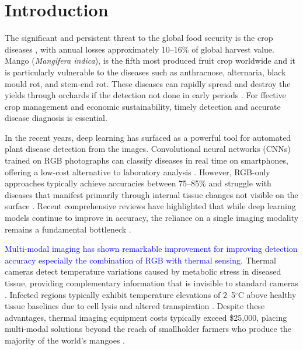 \documentclass[utf8]{FrontiersinHarvard} %
\begin{document}
\section{Introduction}

The significant and persistent threat to the global food security is the crop diseases \cite{fao2021,fao2023,savary2019}, with annual losses approximately 10--16\% of global harvest value. Mango (\textit{Mangifera indica}), is the fifth most produced fruit crop worldwide and it is particularly vulnerable to the diseases such as anthracnose, alternaria, black mould rot, and stem-end rot. These diseases can rapidly spread and destroy the yields  through orchards if the detection not done in early periods \cite{singh2019}. For ffective crop management and economic sustainability, timely detection and accurate disease diagnosis is essential.

In the recent years, deep learning has surfaced as a powerful tool for automated plant disease detection \cite{mohanty2016,ferentinos2018,thakur2022} from the images. Convolutional neural networks (CNNs) trained on RGB photographs can classify diseases in real time on smartphones, offering a low-cost alternative to laboratory analysis \cite{kamilaris2018,coulibaly2022}. However, RGB-only approaches typically achieve accuracies between 75--85\% and struggle with diseases that manifest primarily through internal tissue changes not visible on the surface \cite{pineda2021,abade2021}. Recent comprehensive reviews have highlighted that while deep learning models continue to improve in accuracy, the reliance on a single imaging modality remains a fundamental bottleneck \cite{thakur2022,hasan2024}.

\textcolor{blue}{Multi-modal imaging has shown remarkable improvement for improving detection accuracy \cite{khanal2017,maimaitijiang2020} especially the combination of RGB with thermal sensing.} Thermal cameras detect temperature variations caused by metabolic stress in diseased tissue, providing complementary information that is invisible to standard cameras \cite{mahlein2016,pineda2021}. Infected regions typically exhibit temperature elevations of 2--5$^{\circ}$C above healthy tissue baselines due to cell lysis and altered transpiration \cite{mahlein2016}. Despite these advantages, thermal imaging equipment costs typically exceed \$25,000, placing multi-modal solutions beyond the reach of smallholder farmers who produce the majority of the world's mangoes \cite{sishodia2020}.
\end{document}
